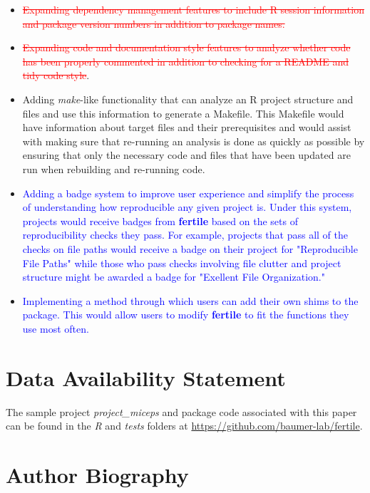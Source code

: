 \documentclass[APA,LATO1COL]{WileyNJD-v2}\usepackage[]{graphicx}\usepackage[]{color}
\newcommand{\R}{\textsf{R}\xspace}
\newcommand{\cmd}[1]{\textit{#1}}
\newcommand{\pkg}[1]{\textbf{#1}}
\begin{document}
\begin{itemize} [noitemsep]
  \item \textcolor{red}{\st{Expanding dependency management features to include R session information and package version numbers in addition to package names.}}
  \item \textcolor{red}{\st{Expanding code and documentation style features to analyze whether code has been properly commented in addition to checking for a README and tidy code style}}.
  \item Adding \cmd{make}-like functionality that can analyze an \R project structure and files and use this information to generate a Makefile. This Makefile would have information about target files and their prerequisites and would assist with making sure that re-running an analysis is done as quickly as possible by ensuring that only the necessary code and files that have been updated are run when rebuilding and re-running code.
  \item \textcolor{blue}{Adding a badge system to improve user experience and simplify the process of understanding how reproducible any given project is. Under this system, projects would receive badges from \pkg{fertile} based on the sets of reproducibility checks they pass. For example, projects that pass all of the checks on file paths would receive a badge on their project for "Reproducible File Paths" while those who pass checks involving file clutter and project structure might be awarded a badge for "Exellent File Organization."}
  \item \textcolor{blue}{Implementing a method through which users can add their own shims to the package. This would allow users to modify \pkg{fertile} to fit the functions they use most often. }
\end{itemize}


\section*{Data Availability Statement}
The sample project \cmd{project\_miceps} and package code associated with this paper can be found in the \cmd{R} and \cmd{tests} folders at \url{https://github.com/baumer-lab/fertile}.

\nocite{*}%
%





\section*{Author Biography}
\end{document}
